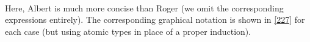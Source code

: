 \documentclass[nolinenum]{jfp}
\begin{document}
\begin{list}{}{\setlength\leftmargin{1.0em}}
{\begin{parray}
\>[5]{\mathnormal{=}\mskip 3.0mu\mathnormal{-}\mskip 3.0mu}\<[E]\\
\>[5]{\mathnormal{=}\mskip 3.0mu}\<[E]\end{parray}}\end{list} 
Here, {\sc{}Albert} is much more concise than {\sc{}Roger} (we
omit the corresponding expressions entirely). The corresponding graphical notation is shown in \cref{227} for each case (but using atomic types in place of a proper induction).
\end{document}
